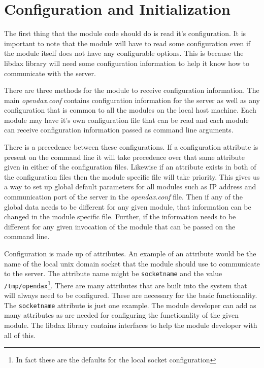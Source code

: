 \chapter{Configuration and Initialization}
The first thing that the module code should do is read it's configuration.  It is important to note that the module will have to read some configuration even if the module itself does not have any configurable options.  This is because the libdax library will need some configuration information to help it know how to communicate with the server.

There are three methods for the module to receive configuration information.  The main \textit{opendax.conf} contains configuration information for the server as well as any configuration that is common to all the modules on the local host machine.  Each module may have it's own configuration file that can be read and each module can receive configuration information passed as command line arguments.

There is a precedence between these configurations.  If a configuration attribute is present on the command line it will take precedence over that same attribute given in either of the configuration files.  Likewise if an attribute exists in both of the configuration files then the module specific file will take priority.  This gives us a way to set up global default parameters for all modules such as IP address and communication port of the server in the \textit{opendax.conf} file.  Then if any of the global data needs to be different for any given module, that information can be changed in the module specific file.  Further, if the information needs to be different for any given invocation of the module that can be passed on the command line.

Configuration is made up of attributes.  An example of an attribute would be the name of the local unix domain socket that the module should use to communicate to the server.  The attribute name might be \texttt{socketname} and the value \texttt{/tmp/opendax}\footnote{In fact these are the defaults for the local socket configuration}.  There are many attributes that are built into the system that will always need to be configured.  These are necessary for the basic functionality.  The \texttt{socketname} attribute is just one example.  The module developer can add as many attributes as are needed for configuring the functionality of the given module.  The libdax library contains interfaces to help the module developer with all of this.

